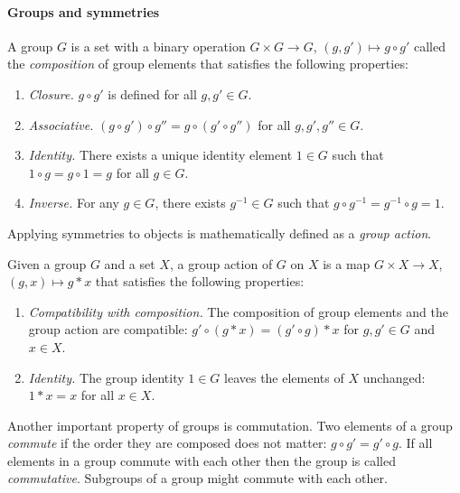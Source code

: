 \paragraph{Groups and symmetries}
\begin{definition}[Group]
	A group $G$ is a set with a binary operation $G \times G \to G$, $(g, g') \mapsto g \circ g'$ called the \textit{composition} of group elements that satisfies the following properties:
	\begin{enumerate}
		\item \textit{Closure.}
		      $g \circ g'$ is defined for all $g, g' \in G$.
		\item \textit{Associative.}
		      $(g \circ g') \circ g'' = g \circ (g' \circ g'')$ for all $g, g', g'' \in G$.
		\item \textit{Identity.}
		      There exists a unique identity element $1 \in G$ such that $1 \circ g = g \circ 1 = g$ for all $g \in G$.
		\item \textit{Inverse.}
		      For any $g \in G$, there exists $g^{-1} \in G$ such that $g \circ g^{-1} = g^{-1} \circ g = 1$.
	\end{enumerate}
\end{definition}

Applying symmetries to objects is mathematically defined as a \textit{group action}.

\begin{definition}
	Given a group $G$ and a set $X$, a group action of $G$ on $X$ is a map $G \times X \to X$, $(g,x) \mapsto g * x$ that satisfies the following properties:
	\begin{enumerate}
		\item \textit{Compatibility with composition.}
		      The composition of group elements and the group action are compatible: $g' \circ (g * x) = (g' \circ g) * x$ for $g,g' \in G$ and $x \in X$.
		\item \textit{Identity.}
		      The group identity $1 \in G$ leaves the elements of $X$ unchanged: $1 * x = x$ for all $x \in X$.
	\end{enumerate}
\end{definition}



Another important property of groups is commutation.
Two elements of a group \textit{commute} if the order they are composed does not matter: $g \circ g' = g' \circ g$.
If all elements in a group commute with each other then the group is called \textit{commutative}.
Subgroups of a group might commute with each other.

